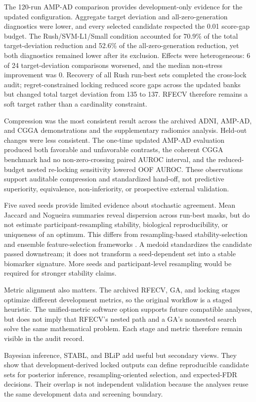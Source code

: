 The 120-run AMP-AD comparison provides development-only evidence for the updated configuration. Aggregate target deviation and all-zero-generation diagnostics were lower, and every selected candidate respected the 0.01 score-gap budget. The Rush/SVM-L1/Small condition accounted for 70.9\% of the total target-deviation reduction and 52.6\% of the all-zero-generation reduction, yet both diagnostics remained lower after its exclusion. Effects were heterogeneous: 6 of 24 target-deviation comparisons worsened, and the median non-stress improvement was 0. Recovery of all Rush run-best sets completed the cross-lock audit; regret-constrained locking reduced score gaps across the updated banks but changed total target deviation from 135 to 137. RFECV therefore remains a soft target rather than a cardinality constraint.

Compression was the most consistent result across the archived ADNI, AMP-AD, and CGGA demonstrations and the supplementary radiomics analysis. Held-out changes were less consistent. The one-time updated AMP-AD evaluation produced both favorable and unfavorable contrasts, the coherent CGGA benchmark had no non-zero-crossing paired AUROC interval, and the reduced-budget nested re-locking sensitivity lowered OOF AUROC. These observations support auditable compression and standardized hand-off, not predictive superiority, equivalence, non-inferiority, or prospective external validation.

Five saved seeds provide limited evidence about stochastic agreement. Mean Jaccard and Nogueira summaries reveal dispersion across run-best masks, but do not estimate participant-resampling stability, biological reproducibility, or uniqueness of an optimum. This differs from resampling-based stability-selection and ensemble feature-selection frameworks \citep{ref09,ref40}. A medoid standardizes the candidate passed downstream; it does not transform a seed-dependent set into a stable biomarker signature. More seeds and participant-level resampling would be required for stronger stability claims.

Metric alignment also matters. The archived RFECV, GA, and locking stages optimize different development metrics, so the original workflow is a staged heuristic. The unified-metric software option supports future compatible analyses, but does not imply that RFECV's nested path and a GA's nonnested search solve the same mathematical problem. Each stage and metric therefore remain visible in the audit record.

Bayesian inference, STABL, and BLiP add useful but secondary views. They show that development-derived locked outputs can define reproducible candidate sets for posterior inference, resampling-oriented selection, and expected-FDR decisions. Their overlap is not independent validation because the analyses reuse the same development data and screening boundary.

